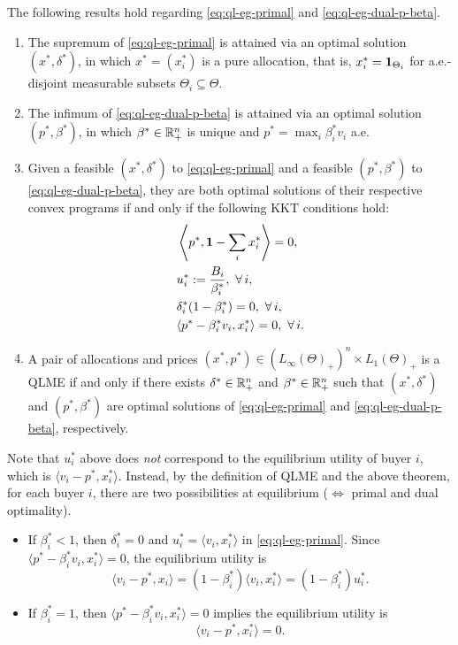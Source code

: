 \begin{theorem} \label{thm:ql-me-duality-and-eq}
    The following results hold regarding \eqref{eq:ql-eg-primal} and \eqref{eq:ql-eg-dual-p-beta}.
    \begin{enumerate}[label=(\alph*)]
        \item The supremum of \eqref{eq:ql-eg-primal} is attained via an optimal solution $(x^*, \delta^*)$, in which $x^* = (x^*_i)$ is a pure allocation, that is, $x^*_i = \mathbf{1}_{\Theta_i}$ for a.e.-disjoint measurable subsets $\Theta_i \subseteq \Theta$. \label{item:ql-primal-attainment}
        \item The infimum of \eqref{eq:ql-eg-dual-p-beta} is attained via an optimal solution $(p^*, \beta^*)$, in which $\beta^*\in \mathbb{R}^n_+$ is unique and $p^* = \max_i \beta^*_i v_i$ a.e. \label{item:ql-dual-attainment}
        \item Given a feasible $(x^*, \delta^*)$  to \eqref{eq:ql-eg-primal} and a feasible $(p^*, \beta^*)$ to \eqref{eq:ql-eg-dual-p-beta}, they are both optimal solutions of their respective convex programs if and only if the following KKT conditions hold:
        \label{item:ql-kkt}
        \begin{align*}
            & \left \langle p^*, \ones - \sum_i x^*_i \right \rangle = 0, \\
            & u^*_i := \frac{B_i}{\beta^*_i}, \ \forall\, i, \\
            & \delta^*_i (1 - \beta^*_i) = 0,\ \forall\, i,\\
            & \langle p^* - \beta^*_i v_i, x^*_i \rangle = 0, \ \forall \, i.
        \end{align*}
        \item A pair of allocations and prices $(x^*, p^*) \in (L_\infty(\Theta)_+)^n \times L_1(\Theta)_+$ is a QLME if and only if there exists $\delta^* \in \mathbb{R}_+^n$ and $\beta^*\in \mathbb{R}_+^n$ such that $(x^*, \delta^*)$ and $(p^*, \beta^*)$ are optimal solutions of \eqref{eq:ql-eg-primal} and \eqref{eq:ql-eg-dual-p-beta}, respectively. 
        \label{item:ql-eq-iff-opt}
    \end{enumerate}
\end{theorem}
Note that $u^*_i$ above does \emph{not} correspond to the equilibrium utility of buyer $i$, which is $\langle v_i - p^*, x^*_i \rangle$.
Instead, by the definition of QLME and the above theorem, for each buyer $i$, there are two possibilities at equilibrium ($\Leftrightarrow$ primal and dual optimality).
\begin{itemize}
    \item If $\beta^*_i < 1$, then $\delta^*_i = 0$ and $u^*_i = \langle v_i, x^*_i \rangle$ in \eqref{eq:ql-eg-primal}. 
    Since $\langle p^* - \beta^*_i v_i, x^*_i \rangle = 0$, the equilibrium utility is 
        \[ \langle v_i - p^*, x_i \rangle = (1 - \beta^*_i) \langle v_i, x^*_i \rangle =(1-\beta^*_i) u^*_i. \]
    \item If $\beta^*_i = 1$, then $\langle p^* - \beta^*_i v_i, x^*_i \rangle = 0$ implies the equilibrium utility is 
    \[  \langle v_i - p^*, x^*_i \rangle = 0. \]
\end{itemize}

